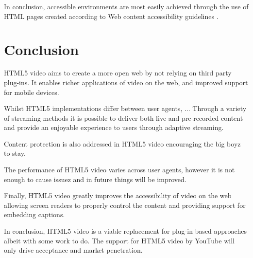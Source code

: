\documentclass[journal]{IEEEtran}
\begin{document}
In conclusion, accessible environments are most easily achieved through the use of HTML pages created according to Web content accessibility guidelines \cite{incollection:accessibilityEvaluationForMultimediaContent}.

\section{Conclusion}
HTML5 video aims to create a more open web by not relying on third party plug-ins. It enables richer applications of video on the web, and improved support for mobile devices. %

Whilst HTML5 implementations differ between user agents, ... %
Through a variety of streaming methods it is possible to deliver both live and pre-recorded content and provide an enjoyable experience to users through adaptive streaming.

Content protection is also addressed in HTML5 video encouraging the big boyz to stay. %

The performance of HTML5 video varies across user agents, however it is not enough to cause issuez and in future things will be improved. %

Finally, HTML5 video greatly improves the accessibility of video on the web allowing screen readers to properly control the content and providing support for embedding captions.

In conclusion, HTML5 video is a viable replacement for plug-in based approaches albeit with some work to do. The support for HTML5 video by YouTube %
will only drive acceptance and market penetration. %


%
%
\end{document}
